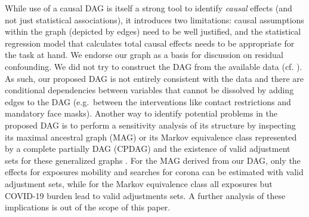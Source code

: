 \documentclass[]{elsarticle} %
\begin{document}
While use of a causal DAG is itself a strong tool to identify \emph{causal} effects (and not just statistical associations), it introduces two limitations: causal assumptions within the graph (depicted by edges) need to be well justified, and the statistical regression model that calculates total causal effects needs to be appropriate for the task at hand. We endorse our graph as a basis for discussion on residual confounding. We did not try to construct the DAG from the available data (cf. \citep{gencoglu2020causal}). As such, our proposed DAG is not entirely consistent with the data and there are conditional dependencies between variables that cannot be dissolved by adding edges to the DAG (e.g.~between the interventions like contact restrictions and mandatory face masks). Another way to identify potential problems in the proposed DAG is to perform a sensitivity analysis of its structure by inspecting its maximal ancestral graph (MAG) or its Markov equivalence class represented by a complete partially DAG (CPDAG) and the existence of valid adjustment sets for these generalized graphs \citep{perkovic2017complete}. For the MAG derived from our DAG, only the effects for exposures mobility and searches for corona can be estimated with valid adjustment sets, while for the Markov equivalence class all exposures but COVID-19 burden lead to valid adjustments sets. A further analysis of these implications is out of the scope of this paper.
\end{document}
